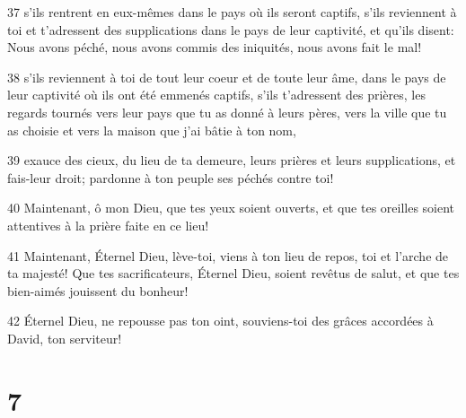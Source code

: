 \par 37 s'ils rentrent en eux-mêmes dans le pays où ils seront captifs, s'ils reviennent à toi et t'adressent des supplications dans le pays de leur captivité, et qu'ils disent: Nous avons péché, nous avons commis des iniquités, nous avons fait le mal!
\par 38 s'ils reviennent à toi de tout leur coeur et de toute leur âme, dans le pays de leur captivité où ils ont été emmenés captifs, s'ils t'adressent des prières, les regards tournés vers leur pays que tu as donné à leurs pères, vers la ville que tu as choisie et vers la maison que j'ai bâtie à ton nom,
\par 39 exauce des cieux, du lieu de ta demeure, leurs prières et leurs supplications, et fais-leur droit; pardonne à ton peuple ses péchés contre toi!
\par 40 Maintenant, ô mon Dieu, que tes yeux soient ouverts, et que tes oreilles soient attentives à la prière faite en ce lieu!
\par 41 Maintenant, Éternel Dieu, lève-toi, viens à ton lieu de repos, toi et l'arche de ta majesté! Que tes sacrificateurs, Éternel Dieu, soient revêtus de salut, et que tes bien-aimés jouissent du bonheur!
\par 42 Éternel Dieu, ne repousse pas ton oint, souviens-toi des grâces accordées à David, ton serviteur!

\chapter{7}

